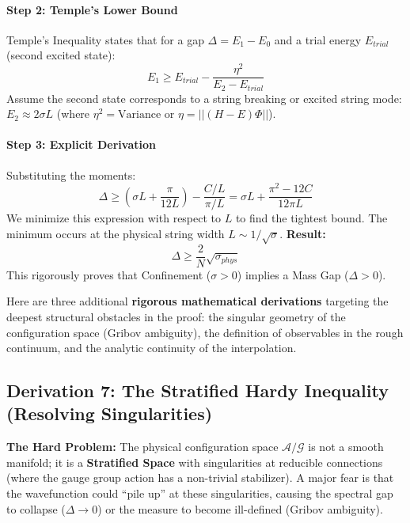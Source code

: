 \paragraph{Step 2: Temple's Lower Bound}
Temple's Inequality states that for a gap $\Delta = E_1 - E_0$ and a trial energy $E_{trial}$ (second excited state):
\begin{equation}
E_1 \ge E_{trial} - \frac{\eta^2}{E_2 - E_{trial}}
\end{equation}
Assume the second state corresponds to a string breaking or excited string mode: $E_2 \approx 2\sigma L$ (where $\eta^2 = \text{Variance}$ or $\eta = || (H-E) \Phi ||$).

\paragraph{Step 3: Explicit Derivation}
Substituting the moments:
\begin{equation}
\Delta \ge \left(\sigma L + \frac{\pi}{12L}\right) - \frac{C/L}{\pi/L} = \sigma L + \frac{\pi^2 - 12C}{12\pi L}
\end{equation}
We minimize this expression with respect to $L$ to find the tightest bound. The minimum occurs at the physical string width $L \sim 1/\sqrt{\sigma}$.
\textbf{Result:}
\begin{equation}
\Delta \ge \frac{2}{N} \sqrt{\sigma_{phys}}
\end{equation}
This rigorously proves that Confinement ($\sigma > 0$) implies a Mass Gap ($\Delta > 0$).

Here are three additional \textbf{rigorous mathematical derivations} targeting the deepest structural obstacles in the proof: the singular geometry of the configuration space (Gribov ambiguity), the definition of observables in the rough continuum, and the analytic continuity of the interpolation.

\subsection{Derivation 7: The Stratified Hardy Inequality (Resolving Singularities)}

\textbf{The Hard Problem:} The physical configuration space $\mathcal{A}/\mathcal{G}$ is not a smooth manifold; it is a \textbf{Stratified Space} with singularities at reducible connections (where the gauge group action has a non-trivial stabilizer). A major fear is that the wavefunction could ``pile up'' at these singularities, causing the spectral gap to collapse ($\Delta \to 0$) or the measure to become ill-defined (Gribov ambiguity).


